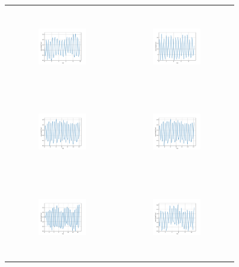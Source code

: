 \begin{figure}[H]
\begin{center}
\begin{tabular}{cc}
\includegraphics[width=0.45\textwidth, height=3.5cm]{graph/omega=3.50_A=1_wave.pdf}
&
\includegraphics[width=0.45\textwidth, height=3.5cm]{graph/omega=3.50_A=2_wave.pdf}\\
\includegraphics[width=0.45\textwidth, height=3.5cm]{graph/omega=3.50_A=3_wave.pdf}
&
\includegraphics[width=0.45\textwidth, height=3.5cm]{graph/omega=3.50_A=4_wave.pdf}\\
\includegraphics[width=0.45\textwidth, height=3.5cm]{graph/omega=3.50_A=5_wave.pdf}
&
\includegraphics[width=0.45\textwidth, height=3.5cm]{graph/omega=3.50_A=6_wave.pdf}\\

\end{tabular}
\end{center}
\end{figure}
